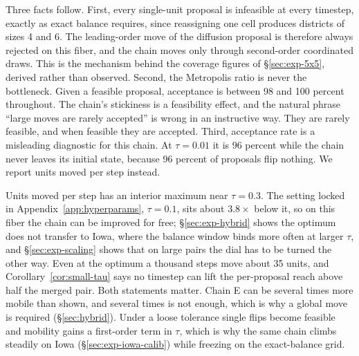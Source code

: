 \documentclass[11pt]{article}
\begin{document}
Three facts follow. First, every single-unit proposal is infeasible at
every timestep, exactly as exact balance requires, since reassigning
one cell produces districts of sizes 4 and 6. The leading-order move
of the diffusion proposal is therefore always rejected on this fiber,
and the chain moves only through second-order coordinated draws. This
is the mechanism behind the coverage figures of \S\ref{sec:exp-5x5},
derived rather than observed. Second, the Metropolis ratio is never
the bottleneck. Given a feasible proposal, acceptance is between 98
and 100 percent throughout. The chain's stickiness is a feasibility
effect, and the natural phrase ``large moves are rarely accepted'' is
wrong in an instructive way. They are rarely feasible, and when
feasible they are accepted. Third, acceptance rate is a misleading
diagnostic for this chain. At $\tau = 0.01$ it is 96 percent while
the chain never leaves its initial state, because 96 percent of
proposals flip nothing. We report units moved per step instead.

Units moved per step has an interior maximum near $\tau = 0.3$. The
setting locked in Appendix~\ref{app:hyperparams}, $\tau = 0.1$, sits
about $3.8\times$ below it, so on this fiber the chain can be improved
for free; \S\ref{sec:exp-hybrid} shows the optimum does not transfer
to Iowa, where the balance window binds more often at larger $\tau$,
and \S\ref{sec:exp-scaling} shows that on large pairs the dial has to
be turned the other way. Even at the optimum a thousand steps move
about 35 units, and Corollary~\ref{cor:small-tau} says no timestep can
lift the per-proposal reach above half the merged pair. Both
statements matter. Chain E can be several times more mobile than
shown, and several times is not enough, which is why a global move is
required (\S\ref{sec:hybrid}). Under a loose tolerance single flips
become feasible and mobility gains a first-order term in $\tau$, which
is why the same chain climbs steadily on Iowa
(\S\ref{sec:exp-iowa-calib}) while freezing on the exact-balance grid.
\end{document}
